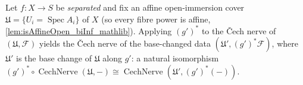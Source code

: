 \begin{lemma}
  \label{lem:twisted_cech_nerve_iso}
  Let \(f : X \to S\) be \emph{separated} and fix an affine open-immersion cover
  \(\mathfrak{U} = \{U_i = \operatorname{Spec} A_i\}\) of \(X\) (so every fibre power is
  affine, \cref{lem:isAffineOpen_biInf_mathlib}). Applying \((g')^*\) to the {\v C}ech
  nerve of \((\mathfrak{U}, \mathcal{F})\) yields the {\v C}ech nerve of the base-changed
  data \((\mathfrak{U}', (g')^*\mathcal{F})\), where \(\mathfrak{U}'\) is the base change of
  \(\mathfrak{U}\) along \(g'\): a natural isomorphism
  \((g')^* \circ \operatorname{CechNerve}(\mathfrak{U}, -) \cong
  \operatorname{CechNerve}(\mathfrak{U}', (g')^*(-))\).
\end{lemma}

